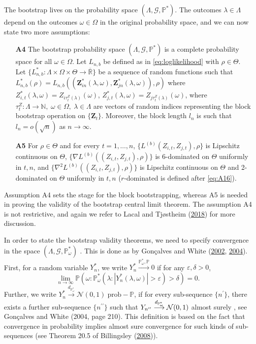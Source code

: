 \documentclass[
  12pt,
  letterpaper]{article}
\numberwithin{equation}{section}
\newcommand{\Z}{\bm{Z}}
\begin{document}
The bootstrap lives on the probability space \((\Lambda, \mathcal{G}, \mathbb{P}^*)\). The outcomes \(\lambda \in \Lambda\) depend on the outcomes \(\omega \in \Omega\) in the original probability space, and we can now state two more assumptions:

\begin{itemize}
\item[\textbf{A4}] The bootstrap probability space $(\Lambda, \mathcal{G}, \mathbb{P}^*)$ is a complete probability space for all $\omega \in \Omega$. Let $L_{n,b}$ be defined as in \eqref{eq:loglikelihood} with $\rho \in \Theta$. Let $\{L^*_{n,b}: \Lambda\times\Omega\times\Theta \rightarrow \overline{\mathbb{R}}\}$ be a sequence of random functions such that $L_{n,b}^*(\rho) = L_{n,b}((\Z_{in}^{*}(\lambda,\omega),\Z_{jn}^*(\lambda,\omega)),\rho)$ where $Z_{i,t}^*(\lambda,\omega) = Z_{i\tau_t^{Z}(\lambda)}(\omega)$, $Z_{j,t}^*(\lambda,\omega)= Z_{j\tau_t^{Z}(\lambda)}(\omega)$, where $\tau_t^{Z}: \Lambda \to \mathbb{N},\; \omega \in \Omega, \; \lambda \in \Lambda$ are vectors of random indices representing the block bootstrap operation on $\{\Z_t\}$. Moreover, the block length $l_n$ is such that $l_n=o(\sqrt{n})$ as $n \to \infty$. 
\item[\textbf{A5}] For $\rho \in \Theta$ and for every $t=1,\ldots,n$, $\{L^{(b)}(Z_{i,t},Z_{j,t}),\rho\}$ is Lipschitz continuous on $\Theta$, $\{\nabla L^{(b)}((Z_{i,t},Z_{j,t}),\rho)\}$ is 6-dominated  on $\Theta$ uniformly in $t,n$, and $\{\nabla^2 L^{(b)}((Z_{i,t},Z_{j,t}),\rho)\}$ is Lipschitz continuous on $\Theta$ and 2-dominated on $\Theta$ uniformly in $t,n$ ($r$-dominated is defined after \eqref{eq:A16}).
\end{itemize}

Assumption A4 sets the stage for the block bootstrapping, whereas A5 is needed in proving the validity of the bootstrap central limit theorem. The assumption A4 is not restrictive, and again we refer to Lacal and Tjøstheim (\protect\hyperlink{ref-lacal2018estimating}{2018}) for more discussion.

In order to state the bootstrap validity theorems, we need to specify convergence in the space \((\Lambda, {\mathcal G}, \mathbb{P}_{\omega}^*)\) . This is done as by Gon\c{c}alves and White (\protect\hyperlink{ref-gonccalves2002bootstrap}{2002}, \protect\hyperlink{ref-gonccalves2004maximum}{2004}). First, for a random variable \(Y_n^*\), we write \(Y_n^* \stackrel {\mathbb{P}_{\omega}^*,\mathbb{P}}{\rightarrow} 0\) if for any \(\varepsilon, \delta > 0\),
\[
\lim_{n \to \infty} \mathbb{P}(\omega:\mathbb{P}_{\omega}^*(\lambda:|Y_n^*(\lambda,\omega)| > \varepsilon) > \delta) = 0.
\]
Further, we write \(Y_n^* \stackrel {d_{\mathbb{P}_{\omega}^*}}{\longrightarrow} {\mathcal N}(0,1)\;\mbox{prob}-\mathbb{P}\), if for every sub-sequence \(\{n^{\prime}\}\), there exists a further sub-sequence \(\{n^{\prime \prime}\}\) such that \(Y_{n^{\prime \prime}} \stackrel {d_{\mathbb{P}_{\omega}^{*}}} {\longrightarrow} {\cal N}(0,1)\) almost surely , see Gon\c{c}alves and White (2004, page 210). This definition is based on the fact that convergence in probability implies almost sure convergence for such kinds of sub-sequences (see Theorem 20.5 of Billingsley (\protect\hyperlink{ref-bill:2008}{2008})).
\end{document}
